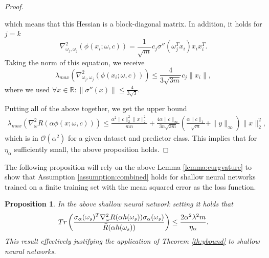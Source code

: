 \documentclass[10pt]{article} %
\newcommand{\bR}{\mathbb{R}}
\newcommand{\cO}{\mathcal{O}}
\newtheorem{proposition}{Proposition}
\begin{document}
\begin{proof}
\begin{itemize}
        which means that this Hessian is a block-diagonal matrix. In addition, it holds for $j=k$
        $$\nabla^2_{\omega_j,\omega_j}(\phi(x_i;\omega,c))=\frac{1}{\sqrt{m}}c_j\sigma''(\omega_j^Tx_i)x_ix^T_i.$$
        Taking the norm of this equation, we receive
        $$\lambda_{max}\left(\nabla^2_{\omega_j,\omega_j}(\phi(x_i;\omega,c))\right)\leq \frac{4}{3\sqrt{3m}}c_j\|x_i\|,$$
        where we used $\forall x\in \bR:\|\sigma''(x)\|\leq \frac{4}{3\sqrt{3}}$.
    \end{itemize}
    Putting all of the above together, we get the upper bound
    \begin{align*}
        \lambda_{max}(\nabla_\omega^2R(\alpha\phi(x;\omega,c)))\leq \frac{\alpha^2\|c\|_2^2\|x\|_2^2}{mn}+\frac{4\alpha\|c\|_\infty}{3n\sqrt{3m}}\left(\frac{\alpha\|c\|_1}{\sqrt{m}}+\|y\|_\infty\right)\|x\|^2_2,
    \end{align*}
    which is in $\cO(\alpha^2)$ for a given dataset and predictor class. This implies that for $\eta_\alpha$ sufficiently small, the above proposition holds.
    \end{proof}
    The following proposition will rely on the above Lemma \ref{lemma:curgvature} to show that Assumption \ref{assumption:combined} holds for shallow neural networks trained on a finite training set with the mean squared error as the loss function. 
    \begin{proposition}\label{prop:shallow}
        In the above shallow neural network setting it holds that 
        $$Tr\left(\frac{\sigma_\alpha(\omega_s)^T\nabla_\omega^2R(\alpha h(\omega_s))\sigma_\alpha(\omega_s)}{\Bar{R}(\alpha h(\omega_s))}\right)\leq \frac{2\alpha^2\lambda^2m}{\eta_\alpha}.$$
        This result effectively justifying the application of Theorem \ref{th:ybound} to shallow neural networks.
    \end{proposition}
\end{document}

